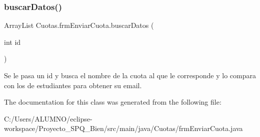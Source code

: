 \subsubsection{\texorpdfstring{buscar\+Datos()}{buscarDatos()}}
{\footnotesize\ttfamily Array\+List Cuotas.\+frm\+Enviar\+Cuota.\+buscar\+Datos (\begin{DoxyParamCaption}\item[{int}]{id }\end{DoxyParamCaption})}

Se le pasa un id y busca el nombre de la cuota al que le corresponde y lo compara con los de estudiantes para obtener su email. 

The documentation for this class was generated from the following file\+:\begin{DoxyCompactItemize}
\item 
C\+:/\+Users/\+A\+L\+U\+M\+N\+O/eclipse-\/workspace/\+Proyecto\+\_\+\+S\+P\+Q\+\_\+Bien/src/main/java/\+Cuotas/frm\+Enviar\+Cuota.\+java\end{DoxyCompactItemize}
